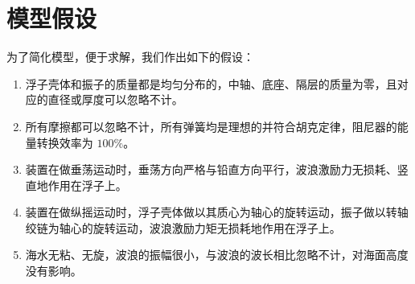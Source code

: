 \section{模型假设}

为了简化模型，便于求解，我们作出如下的假设：

\begin{enumerate}
    \item 浮子壳体和振子的质量都是均匀分布的，中轴、底座、隔层的质量为零，且对应的直径或厚度可以忽略不计。
    \item 所有摩擦都可以忽略不计，所有弹簧均是理想的并符合胡克定律，阻尼器的能量转换效率为 $100\%$。
    \item 装置在做垂荡运动时，垂荡方向严格与铅直方向平行，波浪激励力无损耗、竖直地作用在浮子上。
    \item 装置在做纵摇运动时，浮子壳体做以其质心为轴心的旋转运动，振子做以转轴绞链为轴心的旋转运动，波浪激励力矩无损耗地作用在浮子上。
    \item 海水无粘、无旋，波浪的振幅很小，与波浪的波长相比忽略不计，对海面高度没有影响。
\end{enumerate}